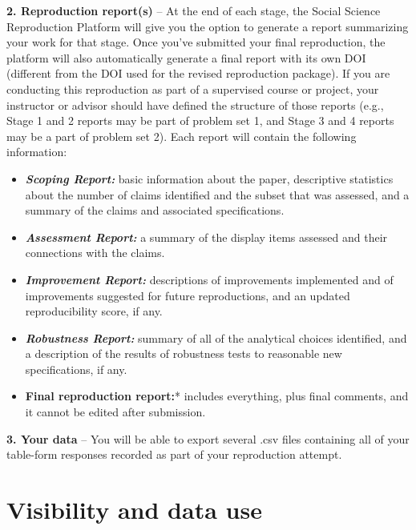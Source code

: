 \documentclass[
]{book}
\providecommand{\tightlist}{%
  \setlength{\itemsep}{0pt}\setlength{\parskip}{0pt}}
\begin{document}
\textbf{2. Reproduction report(s)} -- At the end of each stage, the Social Science Reproduction Platform will give you the option to generate a report summarizing your work for that stage. Once you've submitted your final reproduction, the platform will also automatically generate a final report with its own DOI (different from the DOI used for the revised reproduction package). If you are conducting this reproduction as part of a supervised course or project, your instructor or advisor should have defined the structure of those reports (e.g., Stage 1 and 2 reports may be part of problem set 1, and Stage 3 and 4 reports may be a part of problem set 2). Each report will contain the following information:

\begin{itemize}
\tightlist
\item
  \textbf{\emph{Scoping Report:}} basic information about the paper, descriptive statistics about the number of claims identified and the subset that was assessed, and a summary of the claims and associated specifications.\\
\item
  \textbf{\emph{Assessment Report:}} a summary of the display items assessed and their connections with the claims.\\
\item
  \textbf{\emph{Improvement Report:}} descriptions of improvements implemented and of improvements suggested for future reproductions, and an updated reproducibility score, if any.\\
\item
  \textbf{\emph{Robustness Report:}} summary of all of the analytical choices identified, and a description of the results of robustness tests to reasonable new specifications, if any.\\
\item
  \textbf{Final reproduction report:}* includes everything, plus final comments, and it cannot be edited after submission.
\end{itemize}

\textbf{3. Your data} -- You will be able to export several .csv files containing all of your table-form responses recorded as part of your reproduction attempt.

\hypertarget{visibility-and-data-use}{%
\section{Visibility and data use}\label{visibility-and-data-use}}
\end{document}
